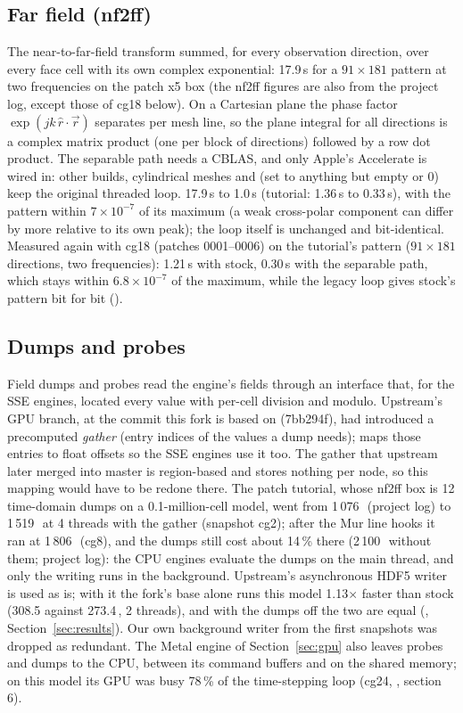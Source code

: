 \subsection{Far field (nf2ff)}
The near-to-far-field transform summed, for every observation direction, over every face cell with its own
complex exponential: 17.9\,s for a $91\times181$ pattern at two frequencies on the patch x5 box (the nf2ff figures
are also from the project log, except those of cg18 below). On a Cartesian plane the phase factor
$\exp(jk\,\hat r\cdot\vec r)$ separates per mesh line, so the plane integral for all directions is a complex matrix
product (one  per block of directions) followed by a row dot product. The separable path needs a CBLAS,
and only Apple's Accelerate is wired in: other builds, cylindrical meshes and  (set to
anything but empty or 0) keep the original threaded loop. 17.9\,s to 1.0\,s (tutorial: 1.36\,s to 0.33\,s), with the
pattern within $7\times10^{-7}$ of its maximum (a weak cross-polar component can differ by more relative to its own
peak); the loop itself is unchanged and bit-identical. Measured again with cg18 (patches 0001--0006) on the tutorial's pattern
($91\times181$ directions, two frequencies): 1.21\,s with stock, 0.30\,s with the separable path, which stays within
$6.8\times10^{-7}$ of the maximum, while the legacy loop gives stock's pattern bit for bit
().

\subsection{Dumps and probes}\label{sec:dumps}
Field dumps and probes read the engine's fields through an interface that, for the SSE engines, located every value
with per-cell division and modulo. Upstream's GPU branch, at the commit this fork is based on (7bb294f), had
introduced a precomputed \emph{gather} (entry indices of the values a dump needs);  maps those
entries to  float offsets so the SSE engines use it too. The gather that upstream later merged into
master is region-based and stores nothing per node, so this mapping would have to be redone there. The patch
tutorial, whose nf2ff box is 12 time-domain dumps on a 0.1-million-cell model, went from 1\,076\,\MC\ (project log) to
1\,519\,\MC\ at 4 threads with the gather (snapshot cg2); after the Mur line hooks it ran at 1\,806\,\MC\ (cg8), and the
dumps still cost about 14\,\% there (2\,100\,\MC\ without them; project log): the CPU engines evaluate the dumps on the
main thread, and only the writing runs in the background. Upstream's asynchronous HDF5 writer is used as is; with it
the fork's base alone runs this model 1.13$\times$ faster than stock (308.5 against 273.4\,\MC, 2 threads), and with
the dumps off the two are equal (, Section~\ref{sec:results}). Our own
background writer from the first snapshots was dropped as redundant. The Metal engine of Section~\ref{sec:gpu} also
leaves probes and dumps to the CPU, between its command buffers and on the shared memory; on this model its GPU was
busy 78\,\% of the time-stepping loop (cg24, , section 6).


